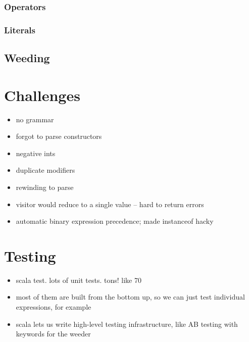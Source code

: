 \documentclass{article}
\begin{document}
\subsubsection{Operators}

\subsubsection{Literals}






\subsection{Weeding}




\section{Challenges}

\begin{itemize}
    \item no grammar
    \item forgot to parse constructors
    \item negative ints
    \item duplicate modifiers
    \item rewinding to parse
    \item visitor would reduce to a single value -- hard to return errors
    \item automatic binary expression precedence; made instanceof hacky
\end{itemize}




\section{Testing}

\begin{itemize}
    \item scala test. lots of unit tests. tons! like 70
    \item most of them are built from the bottom up, so we can just test individual expressions, for example
    \item scala lets us write high-level testing infrastructure, like AB testing with keywords for the weeder
\end{itemize}
\end{document}
